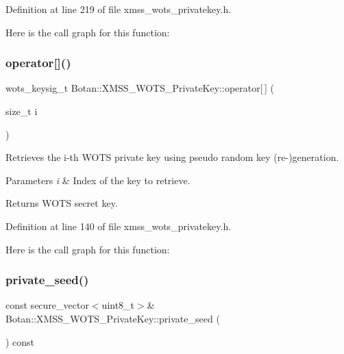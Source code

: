 Definition at line 219 of file xmss\+\_\+wots\+\_\+privatekey.\+h.

Here is the call graph for this function\+:
\mbox{\label{class_botan_1_1_x_m_s_s___w_o_t_s___private_key_ae80b5d24e94411aa807ba31e6662658e}} 
\subsubsection{\texorpdfstring{operator[]()}{operator[]()}}
{\footnotesize\ttfamily wots\+\_\+keysig\+\_\+t Botan\+::\+X\+M\+S\+S\+\_\+\+W\+O\+T\+S\+\_\+\+Private\+Key\+::operator\mbox{[}$\,$\mbox{]} (\begin{DoxyParamCaption}\item[{size\+\_\+t}]{i }\end{DoxyParamCaption})\hspace{0.3cm}{\ttfamily [inline]}}

Retrieves the i-\/th W\+O\+TS private key using pseudo random key (re-\/)generation.


\begin{DoxyParams}{Parameters}
{\em i} & Index of the key to retrieve.\\
\hline
\end{DoxyParams}
\begin{DoxyReturn}{Returns}
W\+O\+TS secret key. 
\end{DoxyReturn}


Definition at line 140 of file xmss\+\_\+wots\+\_\+privatekey.\+h.

Here is the call graph for this function\+:
\mbox{\label{class_botan_1_1_x_m_s_s___w_o_t_s___private_key_a401b9dde3140edf386dba700b880b265}} 
\subsubsection{\texorpdfstring{private\+\_\+seed()}{private\_seed()}}
{\footnotesize\ttfamily const secure\+\_\+vector$<$uint8\+\_\+t$>$\& Botan\+::\+X\+M\+S\+S\+\_\+\+W\+O\+T\+S\+\_\+\+Private\+Key\+::private\+\_\+seed (\begin{DoxyParamCaption}{ }\end{DoxyParamCaption}) const\hspace{0.3cm}{\ttfamily [inline]}}

